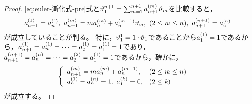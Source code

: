 \documentclass[a4paper,draft]{ltjsarticle}
\begin{document}
\begin{prop}
\begin{proof}
        \eqref{eq:euler-漸化式-pre}式と$\eu{1}^{n+1}=\sum_{m=1}^{n+1}a_{n+1}^{\pare{m}}\eu{m}$を比較すると，
        \begin{equation}
            a_{n+1}^{\pare{1}}=a_{n}^{\pare{1}},\
            a_{n+1}^{\pare{m}}=ma_n^{\pare{m}}+a_n^{\pare{m-1}}\eu{m},\ \pare{2\leq m\leq n},\
            a_{n+1}^{\pare{n+1}}=a_n^{\pare{n}}
        \end{equation}
        が成立していることが判る。
        特に，$\vartheta_{1}^1=1\cdot\vartheta_{1}$であることから$a_{1}^{\pare{1}}=1$であるから，$a_{n+1}^{\pare{1}}=a_n^{\pare{1}}=\cdots=a_2^{\pare{1}}=a_1^{\pare{1}}=1$であり，$a_{n+1}^{\pare{n+1}}=a_n^{\pare{n}}=\cdots=a_2^{\pare{2}}=a_1^{\pare{1}}=1$であるから，確かに，
        \begin{equation}
            \begin{cases}
                \begin{array}{ll}
                    a_{n+1}^{\pare{m}}=m a_n^{\pare{m}}+a_{n}^{\pare{m-1}}, &\pare{2\leq m \leq n}
                    \\
                    a_n^{\pare{1}}=a_{n}^{\pare{n}}=1,\
                    a_1^{\pare{k}}=0, &\pare{2\leq k}
                \end{array}
            \end{cases}
        \end{equation}
        が成立する。
    \end{proof}
\end{prop}
\end{document}
